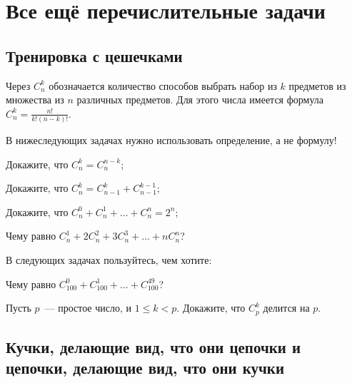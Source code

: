 

\section*{Все ещё перечислительные задачи}



\subsection*{Тренировка с цешечками}

Через $C_n^k$ обозначается количество способов выбрать набор из $k$ предметов из
множества из $n$ различных предметов.
Для этого числа имеется формула $C_n^k = \frac{n!}{k!(n - k)!}$.

В нижеследующих задачах нужно использовать определение, а не формулу!

\begin{problems}

\item
Докажите, что $C_n^{k} = C_n^{n - k}$;

\item
Докажите, что $C_n^{k} = C_{n - 1}^k + C_{n - 1}^{k - 1}$;

\item
Докажите, что $C_n^0 + C_n^1 + \ldots + C_n^n = 2^n$;

\item
Чему равно $C_n^1 + 2 C_n^2 + 3 C_n^3 + \ldots + n C_n^n$?

\end{problems}

В следующих задачах пользуйтесь, чем хотите:

\begin{problems}

\item
Чему равно $C_{100}^0 + C_{100}^1 + \ldots + C_{100}^{49}$?

\item
Пусть $p$~--- простое число, и $1 \leq k < p$.
Докажите, что $C_p^k$ делится на $p$.

\end{problems}


\subsection*{Кучки, делающие вид, что они цепочки и цепочки, делающие вид, что они
кучки}

